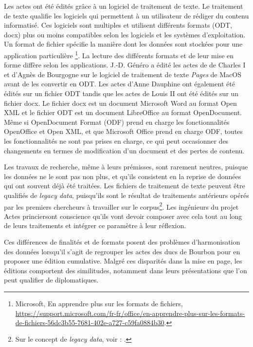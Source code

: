 \par Les actes ont été édités grâce à un logiciel de traitement de texte. Le traitement de texte qualifie les logiciels qui permettent à un utilisateur de rédiger du contenu informatisé. Ces logiciels sont multiples et utilisent différents formats (ODT, docx) plus ou moins compatibles selon les logiciels et les systèmes d'exploitation. Un format de fichier spécifie la manière dont les données sont stockées pour une application particulière \footnote{Microsoft, \og En apprendre plus sur les formats de fichiers\fg, \url{https://support.microsoft.com/fr-fr/office/en-apprendre-plus-sur-les-formats-de-fichiers-56dc3b55-7681-402e-a727-c59fa0884b30}.}. La lecture des différents formats et de leur mise en forme diffère selon les applications. J.-D. Généro a édité les actes de de Charles I et d'Agnès de Bourgogne sur le logiciel de traitement de texte \textit{Pages} de MacOS avant de les convertir en ODT. Les actes d'Anne Dauphine ont également été édités sur un fichier ODT tandis que les actes de Louis II ont été édités sur un fichier docx. Le fichier docx est un document Microsoft Word au format Open XML et le fichier ODT est un document LibreOffice au format OpenDocument. Même si OpenDocument Format (ODF) prend en charge les fonctionnalités OpenOffice et Open XML, et que Microsoft Office prend en charge ODF, toutes les fonctionnalités ne sont pas prises en charge, ce qui peut occasionner des changements en termes de modification d’un document et des pertes de contenu.

\par Les travaux de recherche, même à leurs prémisses, sont rarement neutres, puisque les données ne le sont pas non plus, et qu'ils consistent en la reprise de données qui ont souvent déjà été traitées. Les fichiers de traitement de texte peuvent être qualifiés de \textit{legacy data}, puisqu'ils sont le résultat de traitements antérieurs opérés par les premiers chercheurs à travailler sur le corpus\footnote{Sur le concept de \textit{legacy data}, voir : \cite{reignierVersIndexationAutomatique2022}.}. Les ingénieurs du projet \og Actes princiers\fg \space ont conscience qu'ils vont devoir composer avec cela tout au long de leurs traitements et intégrer ce paramètre à leur réflexion.
\newline 

\par Ces différences de finalités et de formats posent des problèmes d'harmonisation des données lorsqu'il s'agit de regrouper les actes des ducs de Bourbon pour en proposer une édition cumulative. Malgré ces disparités dans la mise en page, les éditions comportent des similitudes, notamment dans leurs présentations que l'on peut qualifier de diplomatiques.
\newpage

